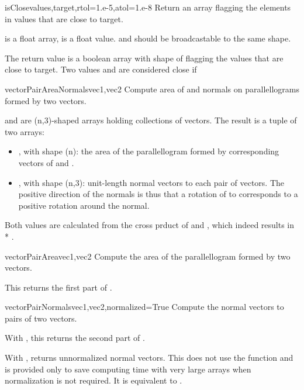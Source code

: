 {{\begin{funcdesc}{isClose}{values,target,rtol=1.e-5,atol=1.e-8}
Return an array flagging the elements in values that are close to target.

 is a float array,  is a float value.
 and  should be broadcastable to the same shape.
    
The return value is a boolean array with shape of  flagging
the values that are close to target.
Two values  and   are considered close if 
\end{funcdesc}

\begin{funcdesc}{vectorPairAreaNormals}{vec1,vec2}
Compute area of and normals on parallellograms formed by two vectors.

 and  are (n,3)-shaped arrays holding collections of vectors. 
The result is a tuple of two arrays:
\begin{itemize}
\item {}, with shape (n): the area of the parallellogram formed by corresponding vectors of  and .
\item {}, with shape (n,3): unit-length normal vectors to each pair of vectors. The positive direction of the normals is thus that a rotation of  to  corresponds to a positive rotation around the normal.
\end{itemize}
Both values are calculated from the cross prduct of  and , which indeed results in  * .
\end{funcdesc}

\begin{funcdesc}{vectorPairArea}{vec1,vec2}
Compute the area of the parallellogram formed by two vectors.

This returns the first part of .
\end{funcdesc}

\begin{funcdesc}{vectorPairNormals}{vec1,vec2,normalized=True}
Compute the normal vectors to pairs of two vectors.

With , this returns the second part of .

With , returns unnormalized normal vectors. This does not use the  function and is provided only to save computing time with very large arrays when normalization is not required. It is equivalent to .


\end{funcdesc}}}
